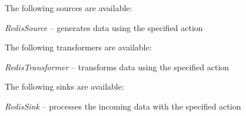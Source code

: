 \documentclass[a4paper]{book}
\begin{document}
\noindent The following sources are available:
\begin{tight_itemize}
  \item \textit{RedisSource} -- generates data using the specified action
\end{tight_itemize}

\noindent The following transformers are available:
\begin{tight_itemize}
    \item \textit{RedisTransformer} -- transforms data using the specified action
\end{tight_itemize}

\noindent The following sinks are available:
\begin{tight_itemize}
  \item \textit{RedisSink} -- processes the incoming data with the specified action
\end{tight_itemize}


\end{document}
